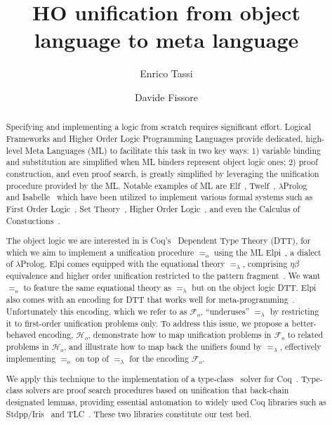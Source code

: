 \documentclass[sigconf,natbib=false]{acmart}
\newcommand{\U}{\ensuremath{=_o}\xspace}
\newcommand{\Ue}{\ensuremath{=_\lambda}\xspace}
\newcommand{\Fo}{\ensuremath{\mathcal{F}_{\!o}\xspace}}
\newcommand{\Ho}{\ensuremath{\mathcal{H}_o}\xspace}
\begin{document}
\title{HO unification from object language to meta language} 

\author{Enrico Tassi}

\author{Davide Fissore}

\begin{abstract}
  Specifying and implementing a logic from scratch requires significant effort.
  Logical Frameworks and Higher Order Logic Programming Languages provide
  dedicated, high-level Meta Languages (ML) to facilitate this task in two
  key ways: 1) variable binding and substitution are simplified when ML binders
  represent object logic ones; 2) proof construction, and even proof search, is
  greatly simplified by leveraging the unification procedure provided by the ML.
  Notable examples of ML are Elf~\cite{elf}, Twelf~\cite{twelf},
  $\lambda$Prolog~\cite{miller_nadathur_2012} and
  Isabelle~\cite{10.1007/978-3-540-71067-7_7}
  which have been utilized to implement various formal systems such as
  First Order Logic~\cite{felty88cade},
  Set Theory~\cite{10.1007/BF00881873},
  Higher Order Logic~\cite{books/sp/NipkowPW02}, and even the Calculus of
  Constuctions~\cite{felty93lics}.
  
  The object logic we are interested in is Coq's~\cite{Coq-refman}
  Dependent Type Theory (DTT),
  for which we aim to implement a unification procedure \U using the ML
  Elpi~\cite{dunchev15lpar}, a dialect of $\lambda$Prolog.
  Elpi comes equipped with the equational theory \Ue, comprising
  $\eta\beta$ equivalence
  and higher order unification restricted to the pattern
  fragment~\cite{miller92jsc}.
  We want \U to feature the same equational theory as \Ue but on the
  object logic DTT. Elpi also comes with an encoding for DTT that works well
  for meta-programming~\cite{tassi:hal-01637063,tassi:hal-01897468,gregoire:hal-03800154,newtc}.
  Unfortunately this encoding, which we refer to as \Fo,
  ``underuses'' \Ue by restricting it to first-order unification problems only. 
  To address this issue, we propose a better-behaved encoding, \Ho,
  demonstrate how to map unification problems in \Fo
  to related problems in \Ho, and illustrate
  how to map back the unifiers found by \Ue, effectively implementing
   \U on top of \Ue for the encoding \Fo.
   
  We apply this technique to the implementation of a type-class~\cite{wadler89}
  solver for Coq~\cite{Coq-refman}.
  Type-class solvers are proof search procedures based on
  unification that back-chain designated lemmas, providing essential
  automation to widely used 
  Coq libraries such as Stdpp/Iris~\cite{JUNG_KREBBERS_JOURDAN_BIZJAK_BIRKEDAL_DREYER_2018}
  and TLC~\cite{10.1007/978-3-642-14052-5_15}. These two libraries
  constitute our test bed.
\end{abstract} 
\end{document}

